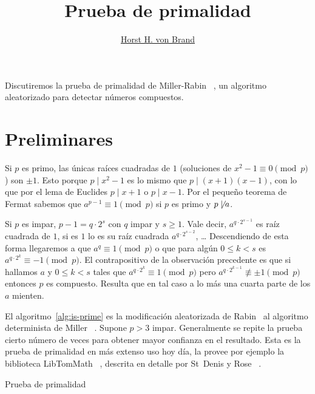 \documentclass[english, german, spanish, fleqn]{article}
\title{Prueba de primalidad}
\author{\href{mailto:vonbrand@inf.utfsm.cl}{Horst H. von Brand}}
\begin{document}


\maketitle
\thispagestyle{empty}

  Discutiremos la prueba de primalidad de Miller-Rabin~%
    \cite{miller76:_Riemann_hypot_tests_primality,
          rabin80:_probab_algor_test_primality},
  un algoritmo aleatorizado para detectar números compuestos.

\section{Preliminares}
\label{sec:preliminares}

  Si \(p\) es primo,
  las únicas raíces cuadradas de \(1\)
  (soluciones de \(x^2 - 1 \equiv 0 \pmod{p}\))
  son \(\pm 1\).
  Esto porque \(p \mid x^2 - 1\) es lo mismo que \(p \mid (x + 1) (x - 1)\),
  con lo que por el lema de Euclides \(p \mid x + 1\) o \(p \mid x - 1\).
  Por el pequeño teorema de Fermat sabemos que \(a^{p - 1} \equiv 1 \pmod{p}\)
  si \(p\) es primo y \(p \not\mid a\).

  Si \(p\) es impar,
  \(p - 1 = q \cdot 2^s\) con \(q\) impar y \(s \ge 1\).
  Vale decir,
  \(a^{q \cdot 2^{s - 1}}\) es raíz cuadrada de \(1\),
  si es \(1\) lo es su raíz cuadrada \(a^{q \cdot 2^{s - 2}}\),
  \ldots
  Descendiendo de esta forma llegaremos a que \(a^q \equiv 1 \pmod{p}\)
  o que para algún \(0 \le k < s\) es \(a^{q \cdot 2^k} \equiv -1 \pmod{p}\).
  El contrapositivo de la observación precedente
  es que si hallamos \(a\) y \(0 \le k < s\)
  tales que \(a^{q \cdot 2^k} \equiv 1 \pmod{p}\)
  pero \(a^{q \cdot 2^{k - 1}} \not\equiv \pm 1 \pmod{p}\)
  entonces \(p\) es compuesto.
  Resulta que en tal caso a lo más una cuarta parte de los \(a\)
  mienten.

  El algoritmo~\ref{alg:is-prime} es la modificación aleatorizada de Rabin~%
     \cite{rabin80:_probab_algor_test_primality}
  al algoritmo determinista de Miller~%
     \cite{miller76:_Riemann_hypot_tests_primality}.
  Supone \(p > 3\) impar.
  Generalmente se repite la prueba cierto número de veces
  para obtener mayor confianza en el resultado.
  Esta es la prueba de primalidad en más extenso uso hoy día,
  la provee por ejemplo la biblioteca LibTomMath~%
    \cite{teamtom19:_libtommath_1.2.0},
  descrita en detalle por St~Denis y Rose~%
    \cite{st_denis06:_bignum_math}.
  \begin{algorithm}
    \DontPrintSemicolon

    \caption{Prueba de primalidad}
    \label{alg:miller-rabin}
  \end{algorithm}
  
\end{document}
